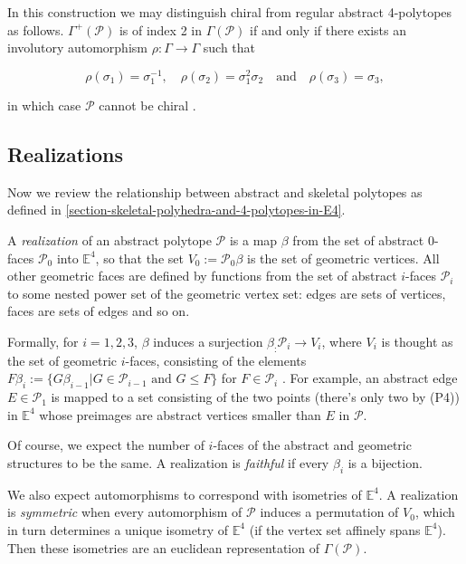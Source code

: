 \documentclass{amsart}
\begin{document}
In this construction we may distinguish chiral from regular abstract 4-polytopes
as follows. $\Gamma^+(\mathcal{P})$ is of index 2 in $\Gamma(\mathcal{P})$ if
and only if there exists an involutory automorphism $\rho:\Gamma\to \Gamma$ such
that

\begin{equation}
\label{equation-combinatorially-chiral}
\rho(\sigma_1)=\sigma_1^{-1},\quad \rho(\sigma_2)
=\sigma_1^2\sigma_2\quad\text{and}\quad \rho(\sigma_3)
=\sigma_3,
\end{equation}

in which case $\mathcal{P}$ cannot be chiral
\cite[Theorem 1]{egon-asia-chiral}.

\subsection{Realizations}
\label{subsection-realizations}

Now we review the relationship between abstract and skeletal polytopes as
defined in \ref{section-skeletal-polyhedra-and-4-polytopes-in-E4}.
	
A \textit{realization} of an abstract polytope $\mathcal{P}$ is a map $\beta$
from the set of abstract 0-faces $\mathcal{P}_0$ into $\mathbb{E}^4$, so that
the set $V_0:=\mathcal{P}_0\beta$ is the set of geometric vertices. All other
geometric faces are defined by functions from the set of abstract $i$-faces
$\mathcal{P}_i$ to some nested power set of the geometric vertex set: edges are
sets of vertices, faces are sets of edges and so on.
	
Formally, for $i=1,2,3$, $\beta$ induces a surjection $\beta_:\mathcal{P}_i\to
V_i$, where $V_i$ is thought as the set of geometric $i$-faces, consisting of
the elements ${F\beta_i:=\{G\beta_{i-1}|G\in\mathcal{P}_{i-1}\text{ and }G\leq
F\}}$ for $F\in\mathcal{P}_i$ \cite[Theorem 5A1]{ARP}. For example, an
abstract edge $E\in\mathcal{P}_1$ is mapped to a set consisting of the two
points (there's only two by (P4)) in $\mathbb{E}^4$ whose preimages are abstract
vertices smaller than $E$ in $\mathcal{P}$.

Of course, we expect the number of $i$-faces of the abstract and geometric
structures to be the same. A realization is \textit{faithful} if every $\beta_i$
is a bijection.
	
We also expect automorphisms to correspond with isometries of $\mathbb{E}^4$. A
realization is \textit{symmetric} when every automorphism of $\mathcal{P}$
induces a permutation of $V_0$, which in turn determines a unique isometry of
$\mathbb{E}^4$ (if the vertex set affinely spans $\mathbb{E}^4$). Then these
isometries are an euclidean representation of $\Gamma(\mathcal{P})$.
	
\end{document}
